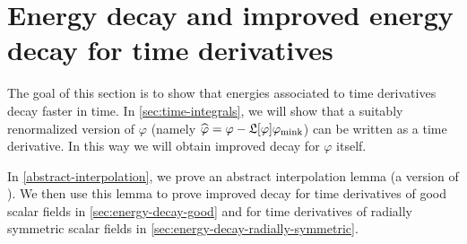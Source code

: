 \documentclass[10pt, reqno]{amsart}
\begin{document}
\section{Energy decay and improved energy decay for time derivatives}
\label{sec:energy-decay} The goal of this section is to show that energies
associated to time derivatives decay faster in time. In \cref{sec:time-integrals},
we will show that a suitably renormalized version of \(\varphi{}\) (namely
\(\widehat{\varphi{}} = \varphi{} -
\mathfrak{L}[\varphi{}]\varphi_{\textnormal{mink}}\)) can be written as a time
derivative. In this way we will obtain improved decay for \(\varphi{}\) itself.

In \cref{abstract-interpolation}, we prove an abstract interpolation lemma (a
version of \cite[Prop.~8.2]{GAJIC2023110058}). We then use this lemma to prove
improved decay for time derivatives of good scalar fields in
\cref{sec:energy-decay-good} and for time derivatives of radially symmetric scalar
fields in \cref{sec:energy-decay-radially-symmetric}.
\end{document}
